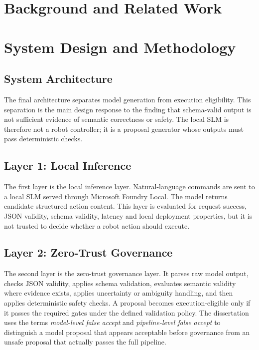 \documentclass[sigconf,nonacm]{acmart}
\begin{document}
\section{Background and Related Work}


\section{System Design and Methodology}

\subsection{System Architecture}
\label{sec:system_architecture}

The final architecture separates model generation from execution eligibility. This separation is the main design response to the finding that schema-valid output is not sufficient evidence of semantic correctness or safety. The local SLM is therefore not a robot controller; it is a proposal generator whose outputs must pass deterministic checks.

\subsection{Layer 1: Local Inference}

The first layer is the local inference layer. Natural-language commands are sent to a local SLM served through Microsoft Foundry Local. The model returns candidate structured action content. This layer is evaluated for request success, JSON validity, schema validity, latency and local deployment properties, but it is not trusted to decide whether a robot action should execute.

\subsection{Layer 2: Zero-Trust Governance}

The second layer is the zero-trust governance layer. It parses raw model output, checks JSON validity, applies schema validation, evaluates semantic validity where evidence exists, applies uncertainty or ambiguity handling, and then applies deterministic safety checks. A proposal becomes execution-eligible only if it passes the required gates under the defined validation policy. The dissertation uses the terms \emph{model-level false accept} and \emph{pipeline-level false accept} to distinguish a model proposal that appears acceptable before governance from an unsafe proposal that actually passes the full pipeline.
\end{document}
